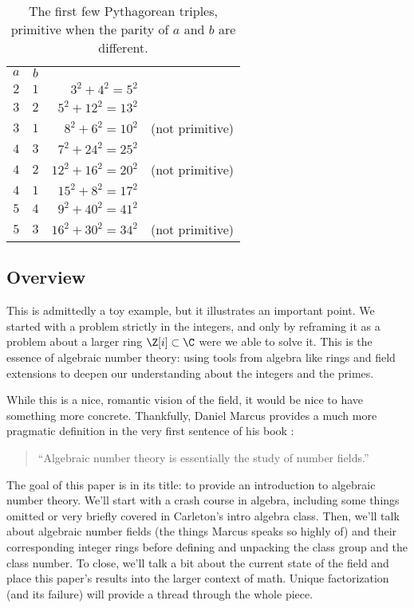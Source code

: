 \begin{table}
    \centering
    \footnotesize
    \begin{tabular}{c | c | r c}
        $a$ & $b$ &                                        \\
        \cline{1-3}
        $2$ & $1$ & $3^2 + 4^2 = 5^2$                      \\
        $3$ & $2$ & $5^2 + 12^2 = 13^2$                    \\
        $3$ & $1$ & $8^2 + 6^2 = 10^2$   & (not primitive) \\
        $4$ & $3$ & $7^2 + 24^2 = 25^2$                    \\
        $4$ & $2$ & $12^2 + 16^2 = 20^2$ & (not primitive) \\
        $4$ & $1$ & $15^2 + 8^2 = 17^2$                    \\
        $5$ & $4$ & $9^2 + 40^2 = 41^2$                    \\
        $5$ & $3$ & $16^2 + 30^2 = 34^2$ & (not primitive)
    \end{tabular}
    \caption{The first few Pythagorean triples, primitive when the parity of $a$ and $b$ are different.}
    \label{tab:pythagorean-triples}
\end{table}

\subsection{Overview}

This is admittedly a toy example, but it illustrates an important point. We started with a problem strictly in the integers, and only by reframing it as a problem about a larger ring $\Z[i] \subset \C$ were we able to solve it. This is the essence of algebraic number theory: using tools from algebra like rings and field extensions to deepen our understanding about the integers and the primes.

While this is a nice, romantic vision of the field, it would be nice to have something more concrete. Thankfully, Daniel Marcus provides a much more pragmatic definition in the very first sentence of his book \cite[1]{marcus}:
\begin{quote}
    ``Algebraic number theory is essentially the study of number fields.''
\end{quote}

The goal of this paper is in its title: to provide an introduction to algebraic number theory. We'll start with a crash course in algebra, including some things omitted or very briefly covered in Carleton's intro algebra class. Then, we'll talk about algebraic number fields (the things Marcus speaks so highly of) and their corresponding integer rings before defining and unpacking the class group and the class number. To close, we'll talk a bit about the current state of the field and place this paper's results into the larger context of math. Unique factorization (and its failure) will provide a thread through the whole piece.

